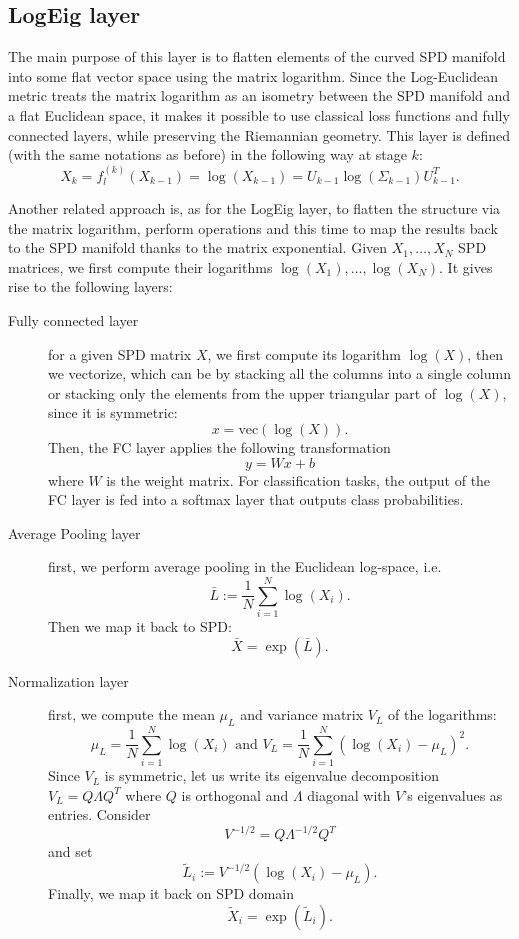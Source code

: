 \documentclass[10pt,a4paper]{book}
\theoremstyle{definition}
\theoremstyle{plain}
\theoremstyle{remark}
\newcommand{\vecto}{\text{vec}}
\begin{document}
\subsection{LogEig layer}
The main purpose of this layer is to flatten elements of the curved SPD manifold into some flat vector space using the matrix logarithm.
Since the Log-Euclidean metric treats the matrix logarithm as an isometry between the SPD manifold and a flat Euclidean space, it makes it possible to use classical loss functions and fully connected layers, while preserving the Riemannian geometry.
This layer is defined (with the same notations as before) in the following way at stage $k$:
$$X_k=f_{l}^{(k)}(X_{k-1})=\log(X_{k-1})=U_{k-1}\log(\Sigma_{k-1})U_{k-1}^T.$$
\par \medskip
Another related approach is, as for the LogEig layer, to flatten the structure via the matrix logarithm, perform operations and this time to map the results back to the SPD manifold thanks to the matrix exponential.
Given $X_1, \dots, X_N$ SPD matrices, we first compute their logarithms $\log(X_1), \dots, \log(X_N)$.
It gives rise to the following layers:
\begin{description}
    \item[Fully connected layer] for a given SPD matrix $X$, we first compute its logarithm $\log(X)$, then we vectorize, which can be by stacking all the columns into a single column or stacking only the elements from the upper triangular part of $\log(X
    )$, since it is symmetric:
    $$x=\vecto(\log(X)).$$
    Then, the FC layer applies the following transformation
    $$y=Wx+b$$
    where $W$ is the weight matrix. For classification tasks, the output of the FC layer is fed into a softmax layer that outputs class probabilities.

    \item[Average Pooling layer] first, we perform average pooling in the Euclidean log-space, i.e.
    $$\bar{L}:=\frac{1}{N}\sum_{i=1}^{N}\log(X_i).$$
    Then we map it back to SPD:
    $$\bar{X}=\exp(\bar{L}).$$
    \item[Normalization layer] first, we compute the mean $\mu_L$ and variance matrix $V_{L}$ of the logarithms:
    $$ 
    \mu_L=\frac{1}{N}\sum_{i=1}^{N} \log(X_i) \text{ and } V_{L}=\frac{1}{N}\sum_{i=1}^{N}(\log(X_i)-\mu_L)^2.
    $$
    Since $V_L$ is symmetric, let us write its eigenvalue decomposition $V_L=Q\Lambda Q^T$ where $Q$ is orthogonal and $\Lambda$ diagonal with $V$'s eigenvalues as entries. 
    Consider
    $$V^{-1/2}=Q\Lambda^{-1/2}Q^T$$
    and set
    $$ \tilde{L}_i:=V^{-1/2}(\log(X_i)-\mu_L).$$
    Finally, we map it back on SPD domain 
    $$\tilde{X}_i=\exp(\tilde{L}_i).$$
\end{description}
\end{document}
